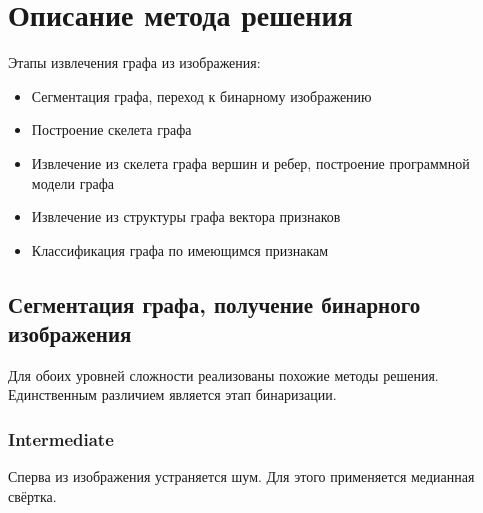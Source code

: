 \documentclass[10pt]{article}
\begin{document}
	
	\section*{Описание метода решения}
	
	Этапы извлечения графа из изображения:
	\begin{itemize}
		\item Сегментация графа, переход к бинарному изображению
		\item Построение скелета графа
		\item Извлечение из скелета графа вершин и ребер, построение программной модели графа
		\item Извлечение из структуры графа вектора признаков
		\item Классификация графа по имеющимся признакам
	\end{itemize}
	
	\subsection*{Сегментация графа, получение бинарного изображения}
	
	Для обоих уровней сложности реализованы похожие методы решения. Единственным различием является этап бинаризации.
	
	\subsubsection*{Intermediate}
	
	Сперва из изображения устраняется шум. Для этого применяется медианная свёртка.
	
\end{document}
